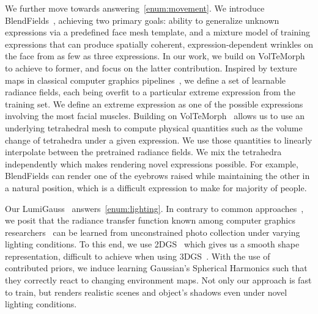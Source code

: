  We further move towards answering~\ref{enum:movement}.
  We introduce BlendFields~\cite{kania2023blendfields}, achieving two primary
  goals: ability to generalize unknown expressions via a predefined face mesh
  template, and a mixture model of training expressions that can produce
  spatially coherent, expression-dependent wrinkles on the face from as few as
  three expressions.
  In our work, we build on VolTeMorph~\cite{garbin2024voltemorph} to achieve to
  former, and focus on the latter contribution.
  Inspired by texture maps in classical computer graphics
  pipelines~\cite{oat2007animated}, we define a set of learnable radiance
  fields, each being overfit to a particular extreme expression from the
  training set.
  We define an extreme expression as one of the possible expressions involving
  the most facial muscles.
  Building on VolTeMorph~\cite{garbin2024voltemorph} allows us to use an
  underlying tetrahedral mesh to compute physical quantities such as the volume
  change of tetrahedra under a given expression.
  We use those quantities to linearly interpolate between the pretrained
  radiance fields.
  We mix the tetrahedra independently which makes rendering novel expressions
  possible.
  For example, BlendFields can render one of the eyebrows raised while
  maintaining the other in a natural position, which is a difficult expression
  to make for majority of people.

  Our LumiGauss~\cite{kaleta2024lumigauss} answers~\ref{enum:lighting}.
  In contrary to common approaches~\cite{rudnev2022nerfosr}, we posit that the
  radiance transfer function known among computer graphics
  researchers~\cite{ramamoorthi2001envmap} can be learned from unconstrained
  photo collection under varying lighting conditions.
  To this end, we use 2DGS~\cite{huang20242d} which gives us a smooth shape
  representation, difficult to achieve when using 3DGS~\cite{kerbl20233d}.
  With the use of contributed priors, we induce learning Gaussian's Spherical
  Harmonics such that they correctly react to changing environment maps.
  Not only our approach is fast to train, but renders realistic scenes and
  object's shadows even under novel lighting conditions.

